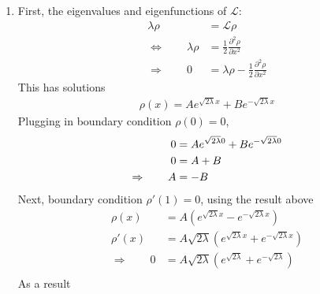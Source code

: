 \documentclass[12pt]{article}
\theoremstyle{plain}
\theoremstyle{definition}
\theoremstyle{remark}
\begin{document}
\begin{enumerate}
    \begin{enumerate}
      \item %
        First, the eigenvalues and eigenfunctions of $\mathscr{L}$:
        \begin{align*}
          \lambda \rho &= \mathscr{L} \rho\\
          \Leftrightarrow \qquad
          \lambda \rho &= \frac{1}{2} \frac{\partial^2 \rho}{\partial x^2}\\
          \Rightarrow \qquad
          0 &= \lambda \rho - \frac{1}{2} \frac{\partial^2 \rho}{\partial x^2}
        \end{align*}
        This has solutions
        \begin{align*}
          \rho(x) = A e^{\sqrt{2\lambda} x} + B e^{-\sqrt{2\lambda} x}
        \end{align*}
        Plugging in boundary condition $\rho(0)=0$,
        \begin{align}
          0 &= A e^{\sqrt{2\lambda} 0} + B e^{-\sqrt{2\lambda} 0} \notag\\
          0 &= A + B \notag \\
          \Rightarrow \qquad
          A &= -B \label{q3a.1}
        \end{align}
        Next, boundary condition $\rho'(1) = 0$, using the result above
        \begin{align*}
          \rho(x) &= A (e^{\sqrt{2\lambda} x} - e^{-\sqrt{2\lambda} x}) \\
          \rho'(x) &= A \sqrt{2\lambda} (e^{\sqrt{2\lambda} x} +  e^{-\sqrt{2\lambda} x}) \\
          \Rightarrow\qquad
          0 &=
          A \sqrt{2\lambda} (e^{\sqrt{2\lambda}} +  e^{-\sqrt{2\lambda}}) \\
        \end{align*}
        As a result
        \begin{align*}
        \end{align*}
    \end{enumerate}
\end{enumerate}
\end{document}
